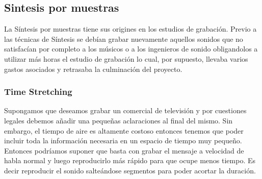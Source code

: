 






\subsection{Sintesis por muestras}
La Síntesis por muestras tiene sus origines en los estudios de grabación. Previo a las técnicas de Síntesis
se debían grabar nuevamente aquellos sonidos que no satisfacían por completo a los músicos o a los ingenieros de sonido obligandolos a utilizar más horas el estudio de grabación
lo cual, por supuesto, llevaba varios gastos asociados y retrasaba la culminación del proyecto.

\subsubsection{Time Stretching}
Supongamos que deseamos grabar un comercial de televisión y por cuestiones legales debemos añadir una pequeñas aclaraciones al final del mismo. Sin embargo, el tiempo de aire es altamente costoso entonces tenemos que poder incluir toda la información necesaria en un espacio de tiempo muy pequeño. Entonces podríamos suponer que basta con grabar el mensaje a velocidad de habla normal y luego reproducirlo más rápido para que ocupe menos tiempo. Es decir reproducir el sonido salteándose segmentos para poder acortar la duración. 

